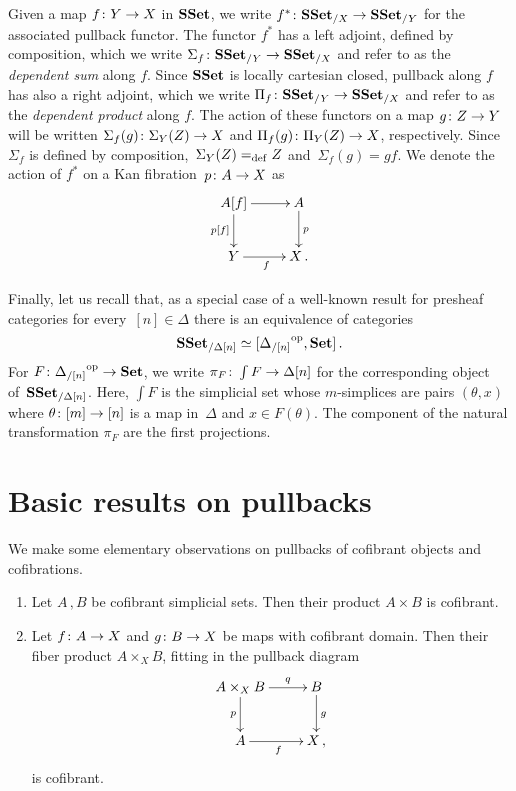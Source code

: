 \documentclass[reqno,10pt,a4paper,oneside,draft]{amsart}
\begin{document}
\medskip

Given a map $f \colon Y \to X$ in $\mathbf{SSet}$, we write $f^* \colon \mathbf{SSet}_{/X} \to \mathbf{SSet}_{/Y}$
for the associated pullback functor. The functor $f^*$ has a left adjoint, defined
by composition, which we write $\Sigma_{f} \colon \mathbf{SSet}_{/Y} \to \mathbf{SSet}_{/X}$ and refer
to as the \emph{dependent sum} along $f$. Since $\mathbf{SSet}$ is locally cartesian closed, pullback
along $f$ has also a right adjoint, which we write 
$\Pi_f \colon \mathbf{SSet}_{/Y} \to \mathbf{SSet}_{/X}$ and refer to as the \emph{dependent
product}  along $f$. The action of these functors on a
map $g \colon Z \to Y$ will be written $\Sigma_f(g) \colon \Sigma_Y(Z) \to X$ and 
$\Pi_f(g) \colon \Pi_Y(Z) \to X$, respectively. Since  $\Sigma_f$ is defined by composition,~$\Sigma_Y(Z) =_{\operatorname{def}} Z$ and~$\Sigma_f(g) = g f $. We denote the action of $f^*$ on a Kan fibration~$p \colon A \to X$ as
\[
\xymatrix{
A[f] \ar[r] \ar[d]_{p[f]} & A \ar[d]^{p} \\
Y \ar[r]_f & X \, .}
\]


Finally, let us recall that, as a special case of a well-known result for presheaf 
categories for every~$[n] \in \Delta$ there is an equivalence of categories
\begin{equation}
\label{equ:psh-slice-sset}
\mathbf{SSet}_{/\Delta[n]} \simeq  [ {\Delta_{/[n]}}^{\operatorname{op}}, \mathbf{Set}]   \, .
\end{equation}
For $F \colon {\Delta_{/[n]}}^{\operatorname{op}} \to \mathbf{Set}$, we write $\pi_F \colon \int F \to \Delta[n]$
for the corresponding object of~$\mathbf{SSet}_{/ \Delta[n]}$. Here, $\int F$ is the
simplicial set whose $m$-simplices are pairs $(\theta, x)$ where $\theta \colon [m] \to [n]$
is a map in~$\Delta$ and $x \in F(\theta)$. The component of the natural
transformation $\pi_F$ are the first projections.







\section{Basic results on pullbacks}
\label{sec:basrp}


We make some elementary observations on pullbacks of cofibrant objects and cofibrations. 




\begin{proposition}\label{lem:cofibrant_fiber_product} \hfill 
\begin{enumerate}[$(i)$] 
\item Let $A \, , B$ be cofibrant simplicial sets. Then their product $A \times B$ is cofibrant.
\item Let $f \colon A \to X$ and $g \colon B \to X$ be maps with  cofibrant domain. Then their
fiber product $A \times_X B$, fitting in the pullback diagram
\[
\xymatrix{
A \times_X B \ar[r]^-{q} \ar[d]_-{p} & B \ar[d]^g \\
A \ar[r]_f & X \, ,}
\]
is cofibrant.
\end{enumerate}
\end{proposition}
\end{document}
